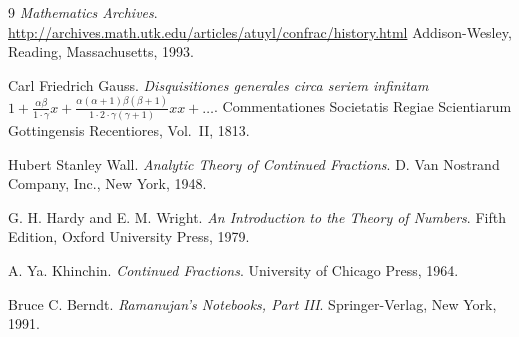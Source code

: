 \documentclass[a4paper]{article}
\begin{document}
\begin{thebibliography}{9}
  \textit{Mathematics Archives}.
  \\
  \url{http://archives.math.utk.edu/articles/atuyl/confrac/history.html}
  Addison-Wesley, Reading, Massachusetts, 1993.

  Carl Friedrich Gauss.
  \textit{Disquisitiones generales circa seriem infinitam $1 + \frac{\alpha\beta}{1\cdot\gamma}x + \frac{\alpha(\alpha+1)\beta(\beta+1)}{1\cdot 2\cdot\gamma(\gamma+1)}xx + \dots$}.
  Commentationes Societatis Regiae Scientiarum Gottingensis Recentiores, Vol.~II, 1813.

  Hubert Stanley Wall.
  \textit{Analytic Theory of Continued Fractions}.
  D. Van Nostrand Company, Inc., New York, 1948.

  G. H. Hardy and E. M. Wright.
  \textit{An Introduction to the Theory of Numbers}.
  Fifth Edition, Oxford University Press, 1979.

  A. Ya. Khinchin.
  \textit{Continued Fractions}.
  University of Chicago Press, 1964.

  Bruce C. Berndt.
  \textit{Ramanujan's Notebooks, Part III}.
  Springer-Verlag, New York, 1991.

\end{thebibliography}
\end{document}
